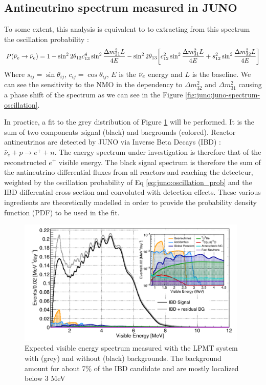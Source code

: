 \documentclass[../main.tex]{subfiles}
\begin{document}
\subsection{Antineutrino spectrum measured in JUNO}
\label{sec:juno:nom_precise_measurement}
To some extent, this analysis is equivalent to to extracting from this spectrum the oscillation probability \cite{an_neutrino_2016} :
\begin{equation*}
  \label{eq:juno:oscillation_prob}
  P(\bar{\nu}_{e} \rightarrow \bar{\nu}_{e}) = 1 - \sin^2 2\theta_{12} c^4_{13} \sin^2 \frac{\Delta m^2_{21}L}{4E} - \sin^2 2\theta_{13} \bigg[ c_{12}^2 \sin^2 \frac{\Delta m_{31}^2 L}{4E} + s^2_{12} \sin^2 \frac{\Delta m_{32}^2 L}{4E} \bigg]
\end{equation*}
Where $s_{ij} = \sin \theta_{ij}$, $c_{ij} = \cos \theta_{ij}$, $E$ is the $\bar{\nu}_{e}$ energy and $L$ is the baseline.
We can see the sensitivity to the NMO in the dependency to $\Delta m_{32}^2$ and $\Delta m^2_{31}$ causing a phase shift of the spectrum as we can see in the Figure \ref{fig:juno:juno-spectrum-oscillation}.

In practice, a fit to the grey distribution of Figure \ref{fig:juno:spectrum_with_background} will be performed. It is the sum of two components :signal (black) and bacgrounds (colored). Reactor antineutrinos are detected by JUNO via Inverse Beta Decays (IBD) : $\bar{\nu}_e + p \rightarrow e^{+} + n$.
The energy spectrum under investigation is therefore that of the reconstructed $e^+$ visible energy. The black signal spectrum is therefore the sum of the antineutrino differential fluxes from all reactors and reaching the detecteur, weighted by the oscillation probability of Eq \ref{eq:juno:oscillation_prob} and the IBD differential cross section and convoluted with detection effects.
These various ingredients are theoretically modelled in order to provide the probability density function (PDF) to be used in the fit.

\begin{figure}[ht]
  \centering
  \includegraphics[height=6cm]{images/juno/spectrum_with_background.png}
  \caption{Expected visible energy spectrum measured with the LPMT system with (grey) and without (black) backgrounds. The background amount for about 7\% of the IBD candidate and are mostly localized below 3 MeV \cite{juno_collaboration_sub-percent_2022}}
  \label{fig:juno:spectrum_with_background}
\end{figure}
\end{document}
